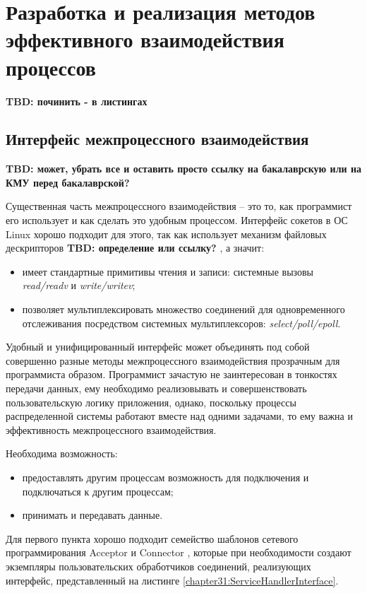\chapter{Разработка и реализация методов эффективного взаимодействия процессов}
\textbf{TBD: починить - в листингах}

\section{Интерфейс межпроцессного взаимодействия}

\textbf{TBD: может, убрать все и оставить просто ссылку на бакалаврскую или на КМУ перед бакалаврской?}

Существенная часть межпроцессного взаимодействия -- это то, как программист его использует и как сделать это удобным процессом. Интерфейс сокетов в ОС Linux хорошо подходит для этого, так как использует механизм файловых дескрипторов
\textbf{TBD: определение или ссылку?}
, а значит:
\begin{itemize}
\item имеет стандартные примитивы чтения и записи: системные вызовы \textit{read/readv} и \textit{write/writev};
\item позволяет мультиплексировать множество соединений для одновременного отслеживания посредством системных мультиплексоров: \textit{select/poll/epoll}.
\end{itemize}

Удобный и унифицированный интерфейс может объединять под собой совершенно разные методы межпроцессного взаимодействия прозрачным для программиста образом. Программист зачастую не заинтересован в тонкостях передачи данных, ему необходимо реализовывать и совершенствовать пользовательскую логику приложения, однако, поскольку процессы распределенной системы работают вместе над одними задачами, то ему важна и эффективность межпроцессного взаимодействия.

Необходима возможность:
\begin{itemize}
\item предоставлять другим процессам возможность для подключения и подключаться к другим процессам;
\item принимать и передавать данные.
\end{itemize}

Для первого пункта хорошо подходит семейство шаблонов сетевого программирования Acceptor и Connector \cite{schmidt1996acceptor}, которые при необходимости создают экземпляры пользовательских обработчиков соединений, реализующих интерфейс, представленный на листинге \ref{chapter31:ServiceHandlerInterface}.

